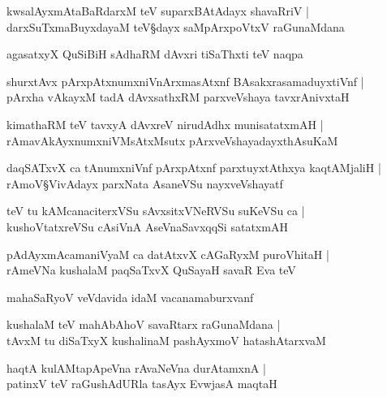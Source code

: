 \begin{shloka}
kwsalAyxmAtaBaRdarxM teV suparxBAtAdayx shavaRriV |\\
darxSuTxmaBuyxdayaM teV\S dayx saMpArxpoVtxV raGunaMdana
\end{shloka}

\begin{shloka}
agasatxyX QuSiBiH sAdhaRM dAvxri tiSaThxti teV naqpa 
\end{shloka}

\begin{shloka}
shurxtAvx pArxpAtxnumxniVnArxmasAtxnf BAsakxrasamaduyxtiVnf |\\
pArxha vAkayxM tadA dAvxsathxRM parxveVshaya tavxrAnivxtaH 
\end{shloka}

\begin{shloka}
kimathaRM teV tavxyA dAvxreV nirudAdhx munisatatxmAH |\\
rAmavAkAyxnumxniVMsAtxMsutx pArxveVshayadayxthAsuKaM 
\end{shloka}

\begin{shloka}
daqSATxvX ca tAnumxniVnf pArxpAtxnf parxtuyxtAthxya kaqtAMjaliH |\\
rAmoV\S VivAdayx parxNata AsaneVSu nayxveVshayatf 
\end{shloka}

\begin{shloka}
teV tu kAMcanaciterxVSu sAvxsitxVNeRVSu suKeVSu ca |\\
kushoVtatxreVSu cAsiVnA AseVnaSavxqqSi satatxmAH 
\end{shloka}

\begin{shloka}
pAdAyxmAcamaniVyaM ca datAtxvX cAGaRyxM puroVhitaH |\\
rAmeVNa kushalaM paqSaTxvX QuSayaH savaR Eva teV 
\end{shloka}

\begin{shloka}
mahaSaRyoV veVdavida idaM vacanamaburxvanf 
\end{shloka}

\begin{shloka}
kushalaM teV mahAbAhoV savaRtarx raGunaMdana |\\
tAvxM tu diSaTxyX kushalinaM pashAyxmoV hatashAtarxvaM 
\end{shloka}

\begin{shloka}
haqtA kulAMtapApeVna rAvaNeVna durAtamxnA |\\
patinxV teV raGushAdURla tasAyx EvwjasA maqtaH 
\end{shloka}

